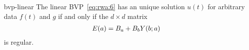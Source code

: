 \begin{Corollary}{bvp-linear}
  The linear BVP~\eqref{eq:rwa:6} has an unique solution $u(t)$ for
  arbitrary data $f(t)$ and $g$ if and only if the $d\times d$ matrix
  \begin{gather*}
    E(a) = \rwaa + \rwab \fundamental(b;a)
  \end{gather*}
  is regular.
\end{Corollary}

